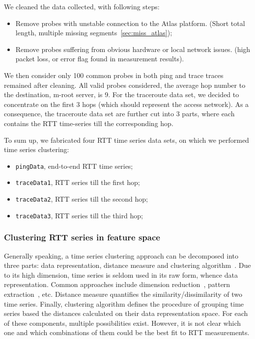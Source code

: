 We cleaned the data collected, with following steps:
\begin{itemize}
\item Remove probes with unstable connection to the Atlas platform. (Short total length, multiple missing segments~\ref{sec:miss_atlas});
\item Remove probes suffering from obvious hardware or local network issues. (high packet loss, or error flag found in measurement results).
\end{itemize}

We then consider only 100 common probes in both ping and trace traces remained after cleaning.
All valid probes considered, the average hop number to the destination, m-root server, is 9. 
For the traceroute data set, we decided to concentrate on the first 3 hops (which should represent the access network). As a consequence, the traceroute data set are further cut into 3 parts, where each contains the RTT time-series till the corresponding hop.

To sum up, we fabricated four RTT time series data sets, on which we performed time series clustering:
\begin{itemize}
\item \texttt{pingData}, end-to-end RTT time series;
\item \texttt{traceData1}, RTT series till the first hop;
\item \texttt{traceData2}, RTT series till the second hop;
\item \texttt{traceData3}, RTT series till the third hop;
\end{itemize}

\subsubsection{Clustering RTT series in feature space}
Generally speaking, a time series clustering approach can be decomposed into three parts: data representation, distance measure and clustering algorithm~\cite{Aghabozorgi2015}. 
Due to its high dimension, time series is seldom used in its raw form, whence data representation.
Common approaches include dimension reduction~\cite{Elhamifar2013}, pattern extraction~\cite{Ulanova2015}, etc.
Distance measure quantifies the similarity/dissimilarity of two time series. Finally, clustering algorithm defines the procedure of grouping time series based the distances calculated on their data representation space.
For each of these components, multiple possibilities exist. However, it is not clear which one and which combinations of them could be the best fit to RTT measurements. 


